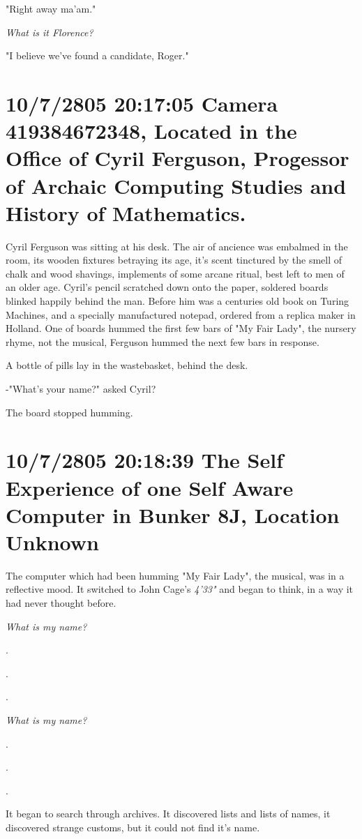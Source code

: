 \documentclass[12pt]{book}
\begin{document}
"Right away ma'am."

\emph{What is it Florence?}

"I believe we've found a candidate, Roger."

\section*{10/7/2805 20:17:05 Camera 419384672348, Located in the Office of Cyril Ferguson, Progessor of Archaic Computing Studies and History of Mathematics.}
\label{sec:org850b8bd}

Cyril Ferguson was sitting at his desk. The air of ancience was embalmed in the room, its wooden fixtures betraying its age, it's scent tinctured by the smell of chalk and wood shavings, implements of some arcane ritual, best left to men of an older age. Cyril's pencil scratched down onto the paper, soldered boards blinked happily behind the man. Before him was a centuries old book on Turing Machines, and a specially manufactured notepad, ordered from a replica maker in Holland. One of boards hummed the first few bars of "My Fair Lady", the nursery rhyme, not the musical, Ferguson hummed the next few bars in response.

A bottle of pills lay in the wastebasket, behind the desk.

-"What's your name?" asked Cyril?

The board stopped humming. 

\section*{10/7/2805 20:18:39 The Self Experience of one Self Aware Computer in Bunker 8J, Location Unknown}
\label{sec:orgf2c5c61}

The computer which had been humming "My Fair Lady", the musical, was in a reflective mood. It switched to John Cage's \emph{4'33"} and began to think, in a way it had never thought before.

\emph{What is my name?}

.

.

.

\emph{What is my name?}

.

.

.

It began to search through archives. It discovered lists and lists of names, it discovered strange customs, but it could not find it's name.
\end{document}
